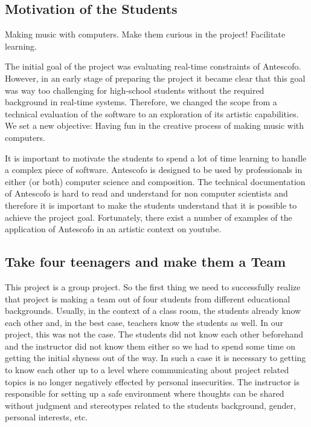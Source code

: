 \documentclass[onecolumn,nocopyrightspace,preprint]{sigplanconf}
\begin{document}
\subsection{Motivation of the Students}

Making music with computers.
Make them curious in the project!
Facilitate learning.


The initial goal of the project was evaluating real-time constraints of
Antescofo. However, in an early stage of preparing the project it became clear
that this goal was way too challenging for high-school students without the
required background in real-time systems. Therefore, we changed the scope from
a technical evaluation of the software to an exploration of its artistic
capabilities. We set a new objective: Having fun in the creative process of
making music with computers.


It is important to motivate the students to spend a lot of time learning to
handle a complex piece of software. Antescofo is designed to be used by
professionals in either (or both) computer science and composition. The
technical documentation of Antescofo is hard to read and understand for non
computer scientists and therefore it is important to make the students
understand that it is possible to achieve the project goal. Fortunately, there
exist a number of examples of the application of Antescofo in an artistic
context on youtube.

\subsection{Take four teenagers and make them a Team}

This project is a group project. So the first thing we need to successfully
realize that project is making a team out of four students from different
educational backgrounds. Usually, in the context of a class room, the students
already know each other and, in the best case, teachers know the students as
well. In our project, this was not the case. The students did not know each
other beforehand and the instructor did not know them either so we had to
spend some time on getting the initial shyness out of the way.
In such a case it is necessary to getting to know each other up to a level
where communicating about project related topics is no longer negatively
effected by personal insecurities. The instructor is responsible for setting
up a safe environment where thoughts can be shared without judgment and
stereotypes related to the students background, gender, personal interests, etc.
\end{document}
